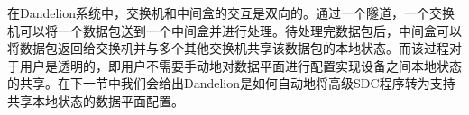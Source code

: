 \documentclass{ctexart}
\newcommand{\codeword}[1]{\texttt{\small{#1}}}
\begin{document}


在Dandelion系统中，交换机和中间盒的交互是双向的。通过一个隧道，一个交换机可以将一个数据包送到一个中间盒并进行处理。待处理完数据包后，中间盒可以将数据包返回给交换机并与多个其他交换机共享该数据包的本地状态。而该过程对于用户是透明的，即用户不需要手动地对数据平面进行配置实现设备之间本地状态的共享。在下一节中我们会给出Dandelion是如何自动地将高级SDC程序转为支持共享本地状态的数据平面配置。

\end{document}
